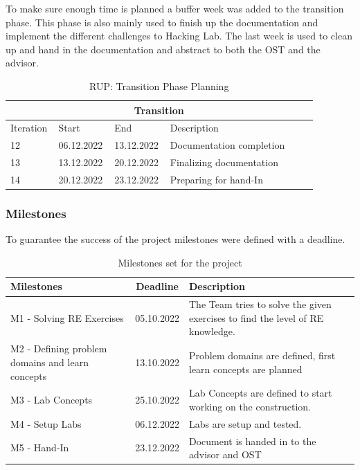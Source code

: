 \noindent To make sure enough time is planned a buffer week was added to the transition phase. This phase is also mainly used to finish up the documentation and implement the different challenges to Hacking Lab. The last week is used to clean up and hand in the documentation and abstract to both the OST and the advisor.
\begin{table}[H]
    \centering
    \begin{tabular}{|p{0.12\linewidth}|p{0.15\linewidth}|p{0.15\linewidth}|p{0.46\linewidth}|}
        \hline
        \multicolumn{4}{||c||}{\textbf{Transition}} \\
        \hline \hline
        Iteration & Start & End & Description \\
        \hline \hline
        12 & 06.12.2022 & 13.12.2022 & Documentation completion \\
        \hline
        13 & 13.12.2022 & 20.12.2022 & Finalizing documentation \\
        \hline
        14 & 20.12.2022 & 23.12.2022 & Preparing for hand-In \\
        \hline
    \end{tabular}
    \caption{RUP: Transition Phase Planning}
    \label{transition_table}
\end{table}

\subsubsection*{Milestones}
To guarantee the success of the project milestones were defined with a deadline.

\begin{table}[H]
    \centering
    \begin{tabular}[]{|| p{5cm} | c | p{6.2cm} ||}
        \hline
        Milestones & Deadline & Description \\
        \hline \hline
        M1 - Solving RE Exercises & 05.10.2022 & The Team tries to solve the given exercises to find the level of RE knowledge. \\
        \hline
        M2 - Defining problem domains and learn concepts& 13.10.2022 & Problem domains are defined, first learn concepts are planned \\
        \hline
        M3 - Lab Concepts & 25.10.2022 & Lab Concepts are defined to start working on the construction. \\
        \hline
        M4 - Setup Labs & 06.12.2022 & Labs are setup and tested. \\
        \hline
        M5 - Hand-In & 23.12.2022 & Document is handed in to the advisor and OST \\
        \hline
    \end{tabular}
    \caption{Milestones set for the project}
    \label{milestones_table}
\end{table}

